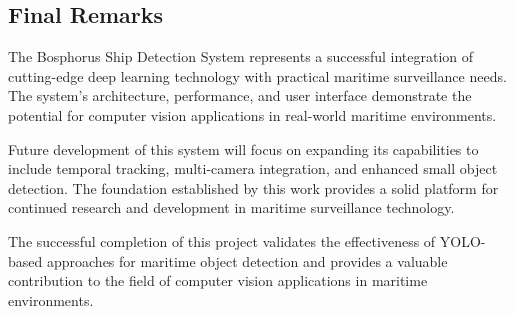 \documentclass[a4paper,11pt]{article}
\begin{document}
\subsection{Final Remarks}
The Bosphorus Ship Detection System represents a successful integration of cutting-edge deep learning technology with practical maritime surveillance needs. The system's architecture, performance, and user interface demonstrate the potential for computer vision applications in real-world maritime environments.

Future development of this system will focus on expanding its capabilities to include temporal tracking, multi-camera integration, and enhanced small object detection. The foundation established by this work provides a solid platform for continued research and development in maritime surveillance technology.

The successful completion of this project validates the effectiveness of YOLO-based approaches for maritime object detection and provides a valuable contribution to the field of computer vision applications in maritime environments.



\end{document}
